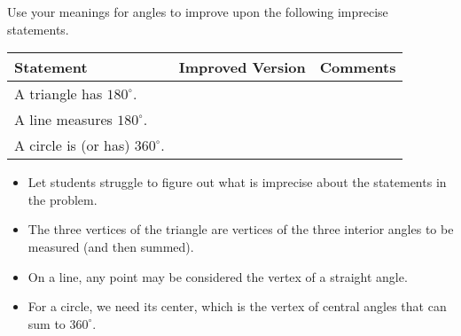 \newpage
\begin{prob}
Use your meanings for angles to improve upon the following imprecise statements. 

{\renewcommand{\arraystretch}{1.5}
\begin{tabular}{|>{\centering\arraybackslash}m{4cm}|>{\centering\arraybackslash}m{9.5cm}|>{\centering\arraybackslash}m{4cm}|}\hline
Statement & Improved Version & Comments \\\hline

\rule{0pt}{1cm}A triangle has $180^\circ$. & & \\ \hline

\rule{0pt}{1cm}A line measures $180^\circ$. & & \\ \hline

\rule{0pt}{1cm}A circle is (or has) $360^\circ$. & & \\ \hline
 \hline
\end{tabular}}
\end{prob}

\begin{teachingnote}
\begin{itemize}
\itemsep0em
\item Let students struggle to figure out what is imprecise about the statements in the problem.  
\item The three vertices of the triangle are vertices of the three interior angles to be measured (and then summed).  
\item On a line, any point may be considered the vertex of a straight angle.
\item For a circle, we need its center, which is the vertex of central angles 
that can sum to $360^\circ$.  
\end{itemize}
\end{teachingnote}







